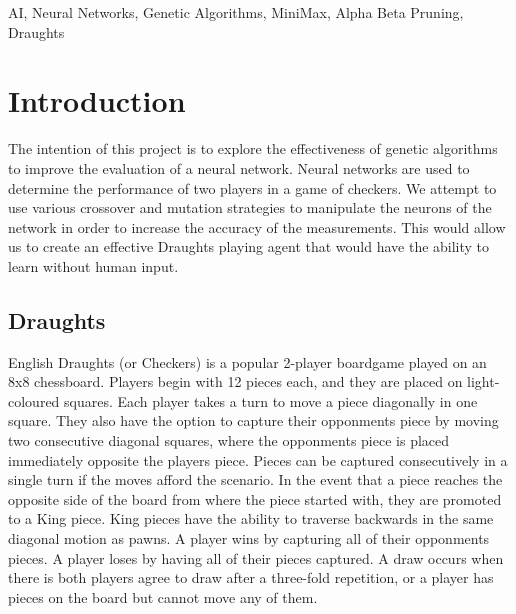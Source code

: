 \documentclass[12pt,a4paper]{article}
\begin{document}
\begin{keywords}
AI, Neural Networks, Genetic Algorithms, MiniMax, Alpha Beta Pruning, Draughts

\end{keywords}





\section{Introduction}

    The intention of this project is to explore the effectiveness of genetic algorithms to improve the evaluation of a neural network. Neural networks are used to determine the performance of two players in a game of checkers. We attempt to use various crossover and mutation strategies to manipulate the neurons of the network in order to increase the accuracy of the measurements. This would allow us to create an effective Draughts playing agent that would have the ability to learn without human input.

\subsection*{Draughts}

    English Draughts (or Checkers) is a popular 2-player boardgame played on an 8x8 chessboard. Players begin with 12 pieces each, and they are placed on light-coloured squares. Each player takes a turn to move a piece diagonally in one square. They also have the option to capture their opponments piece by moving two consecutive diagonal squares, where the opponments piece is placed immediately opposite the players piece. Pieces can be captured consecutively in a single turn if the moves afford the scenario. In the event that a piece reaches the opposite side of the board from where the piece started with, they are promoted to a King piece. King pieces have the ability to traverse backwards in the same diagonal motion as pawns. A player wins by capturing all of their opponments pieces. A player loses by having all of their pieces captured. A draw occurs when there is both players agree to draw after a  three-fold repetition, or a player has pieces on the board but cannot move any of them.
\end{document}
